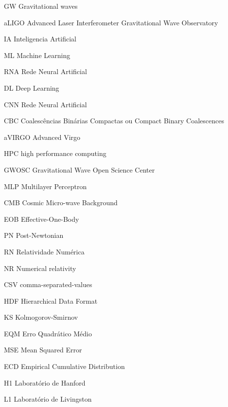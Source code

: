 

\begin{simbolos} \itemsep -1pt
    
	\item[GW] Gravitational waves
	\item[aLIGO] Advanced Laser Interferometer Gravitational Wave Observatory
	\item[IA] Inteligencia Artificial
	\item[ML] Machine Learning
	\item[RNA] Rede Neural Artificial
	\item[DL] Deep Learning
	\item[CNN] Rede Neural Artificial
	\item[CBC] Coalescências Binárias Compactas ou Compact Binary Coalescences
    \item[aVIRGO] Advanced Virgo
    \item[HPC] high performance computing
    \item[GWOSC] Gravitational Wave Open Science Center
    \item[MLP] Multilayer Perceptron
    \item[CMB] Cosmic Micro-wave Background 
    \item[EOB] Effective-One-Body 
    \item[PN] Post-Newtonian 
    \item[RN] Relatividade Numérica
    \item[NR] Numerical relativity
    \item[CSV] comma-separated-values
    \item[HDF] Hierarchical Data Format
    \item[KS] Kolmogorov-Smirnov
    \item[EQM] Erro Quadrático Médio
    \item[MSE] Mean Squared Error
    \item[ECD] Empirical  Cumulative  Distribution
    \item[H1] Laboratório de Hanford
    \item[L1] Laboratório de Livingston
    


\end{simbolos}

